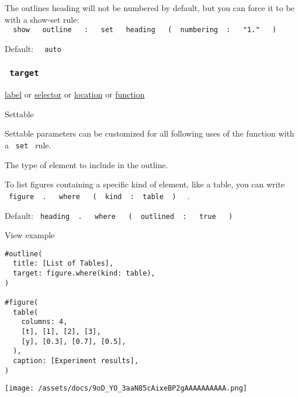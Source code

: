 The outline\textquotesingle s heading will not be numbered by default,
but you can force it to be with a show-set rule:
\texttt{\ }{\texttt{\ show\ }}\texttt{\ }{\texttt{\ outline\ }}\texttt{\ }{\texttt{\ :\ }}\texttt{\ }{\texttt{\ set\ }}\texttt{\ }{\texttt{\ heading\ }}\texttt{\ }{\texttt{\ (\ }}\texttt{\ numbering\ }{\texttt{\ :\ }}\texttt{\ }{\texttt{\ "1."\ }}\texttt{\ }{\texttt{\ )\ }}\texttt{\ }

Default: \texttt{\ }{\texttt{\ auto\ }}\texttt{\ }

\subsubsection{\texorpdfstring{\texttt{\ target\ }}{ target }}\label{parameters-target}

\href{/docs/reference/foundations/label/}{label} {or}
\href{/docs/reference/foundations/selector/}{selector} {or}
\href{/docs/reference/introspection/location/}{location} {or}
\href{/docs/reference/foundations/function/}{function}

{{ Settable }}

\label{parameters-target-settable-tooltip}
Settable parameters can be customized for all following uses of the
function with a \texttt{\ set\ } rule.

The type of element to include in the outline.

To list figures containing a specific kind of element, like a table, you
can write
\texttt{\ figure\ }{\texttt{\ .\ }}\texttt{\ }{\texttt{\ where\ }}\texttt{\ }{\texttt{\ (\ }}\texttt{\ kind\ }{\texttt{\ :\ }}\texttt{\ table\ }{\texttt{\ )\ }}\texttt{\ }
.

Default:
\texttt{\ heading\ }{\texttt{\ .\ }}\texttt{\ }{\texttt{\ where\ }}\texttt{\ }{\texttt{\ (\ }}\texttt{\ outlined\ }{\texttt{\ :\ }}\texttt{\ }{\texttt{\ true\ }}\texttt{\ }{\texttt{\ )\ }}\texttt{\ }


View example

\begin{verbatim}
#outline(
  title: [List of Tables],
  target: figure.where(kind: table),
)

#figure(
  table(
    columns: 4,
    [t], [1], [2], [3],
    [y], [0.3], [0.7], [0.5],
  ),
  caption: [Experiment results],
)
\end{verbatim}

\texttt{[image: /assets/docs/9oD\_YO\_3aaN85cAixeBP2gAAAAAAAAAA.png]}

